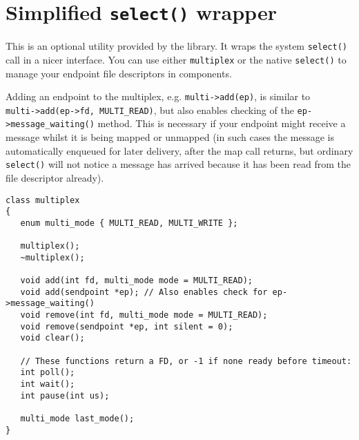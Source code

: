 \documentclass[12pt,a4paper,twoside]{article}
\renewcommand{\_}{\texttt{\symbol{95}}}
\begin{document}
\section{Simplified \texttt{select()} wrapper}

This is an optional utility provided by the library. It wraps
the system \verb^select()^ call in a nicer interface. You can use
either \verb^multiplex^ or the native \verb^select()^ to manage
your endpoint file descriptors in components.

Adding an endpoint to the multiplex, e.g. \verb^multi->add(ep)^,
is similar to\\
\verb^multi->add(ep->fd, MULTI_READ)^, but also
enables checking of the \verb^ep->message_waiting()^ method. This
is necessary if your endpoint might receive a message whilst
it is being mapped or unmapped (in such cases the message is
automatically enqueued for later delivery, after the map call returns,
but ordinary \verb^select()^ will not notice a message has arrived
because it has been read from the file descriptor already).

\begin{verbatim}
class multiplex
{
   enum multi_mode { MULTI_READ, MULTI_WRITE };

   multiplex();
   ~multiplex();

   void add(int fd, multi_mode mode = MULTI_READ);
   void add(sendpoint *ep); // Also enables check for ep->message_waiting()
   void remove(int fd, multi_mode mode = MULTI_READ);
   void remove(sendpoint *ep, int silent = 0);
   void clear();

   // These functions return a FD, or -1 if none ready before timeout:
   int poll();
   int wait();
   int pause(int us);

   multi_mode last_mode();
}
\end{verbatim}
\end{document}
